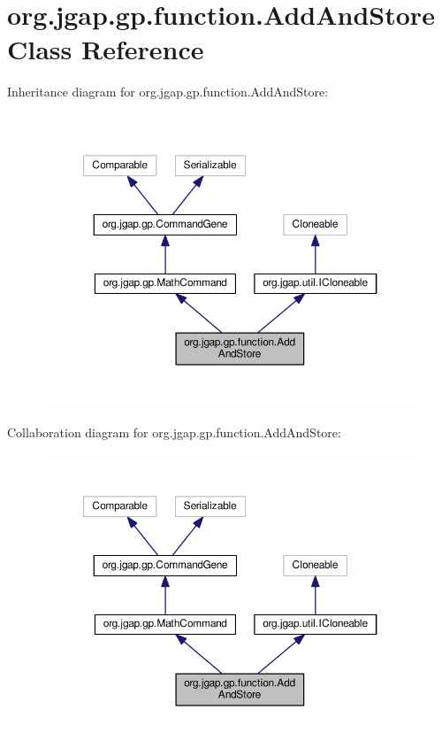 \hypertarget{classorg_1_1jgap_1_1gp_1_1function_1_1_add_and_store}{\section{org.\-jgap.\-gp.\-function.\-Add\-And\-Store Class Reference}
\label{classorg_1_1jgap_1_1gp_1_1function_1_1_add_and_store}
}


Inheritance diagram for org.\-jgap.\-gp.\-function.\-Add\-And\-Store\-:
\nopagebreak
\begin{figure}[H]
\begin{center}
\leavevmode
\includegraphics[width=350pt]{classorg_1_1jgap_1_1gp_1_1function_1_1_add_and_store__inherit__graph}
\end{center}
\end{figure}


Collaboration diagram for org.\-jgap.\-gp.\-function.\-Add\-And\-Store\-:
\nopagebreak
\begin{figure}[H]
\begin{center}
\leavevmode
\includegraphics[width=350pt]{classorg_1_1jgap_1_1gp_1_1function_1_1_add_and_store__coll__graph}
\end{center}
\end{figure}
